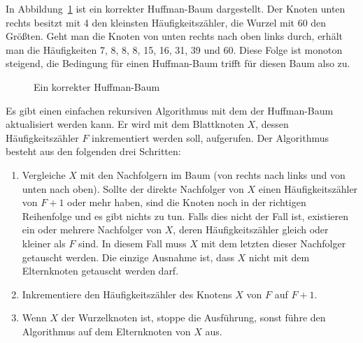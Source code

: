 \documentclass[twoside,11pt,a4paper]{article}
\theoremstyle{break}
\begin{document}
In Abbildung~\ref{fig:HUPD0} ist ein korrekter Huffman-Baum
dargestellt. Der Knoten unten rechts besitzt mit 4 den kleinsten
Häufigkeitszähler, die Wurzel mit 60 den Größten. Geht man die Knoten
von unten rechts nach oben links durch, erhält man die Häufigkeiten 7,
8, 8, 8, 15, 16, 31, 39 und 60. Diese Folge ist monoton steigend, die
Bedingung für einen Huffman-Baum trifft für diesen Baum also zu.

\begin{figure}[h]
\centering
{}
\caption{Ein korrekter Huffman-Baum} \label{fig:HUPD0}
\end{figure}

Es gibt einen einfachen rekursiven Algorithmus mit dem der
Huffman-Baum aktualisiert werden kann. Er wird mit dem Blattknoten
$X$, dessen Häufigkeitszähler $F$ inkrementiert werden soll,
aufgerufen. Der Algorithmus besteht aus den folgenden drei Schritten:

\begin{enumerate}
\item Vergleiche $X$ mit den Nachfolgern im Baum (von rechts nach
  links und von unten nach oben). Sollte der direkte Nachfolger von
  $X$ einen Häufigkeitszähler von $F+1$ oder mehr haben, sind die
  Knoten noch in der richtigen Reihenfolge und es gibt nichts zu tun.
  Falls dies nicht der Fall ist, existieren ein oder mehrere
  Nachfolger von $X$, deren Häufigkeitszähler gleich oder kleiner als
  $F$ sind. In diesem Fall muss $X$ mit dem letzten dieser Nachfolger
  getauscht werden. Die einzige Ausnahme ist, dass $X$ nicht mit dem
  Elternknoten getauscht werden darf.
\item Inkrementiere den Häufigkeitszähler des Knotens $X$ von $F$ auf
  $F+1$.
\item Wenn $X$ der Wurzelknoten ist, stoppe die Ausführung, sonst
  führe den Algorithmus auf dem Elternknoten von $X$ aus.
\end{enumerate}
\end{document}

